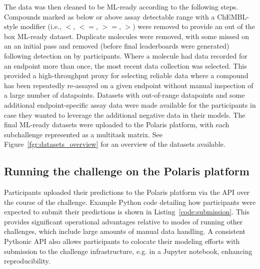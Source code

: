 \documentclass[journal=jcim,manuscript=article]{achemso}
\begin{document}
The data was then cleaned to be ML-ready according to the following steps. Compounds marked as below or above assay detectable range with a ChEMBL\cite{zdrazil_2024_chembl}-style modifier (i.e., $<$, $<=$, $>=$, $>$) were removed to provide an out of the box ML-ready dataset.  Duplicate molecules were removed, with some missed on an an initial pass and removed (before final leaderboards were generated) following detection on by participants. Where a molecule had data recorded for an endpoint more than once, the most recent data collection was selected. This provided a high-throughput proxy for selecting reliable data where a compound has been repeatedly re-assayed on a given  endpoint without manual inspection of a large number of datapoints. Datasets with out-of-range datapoints and some additional endpoint-specific assay data were made available for the participants in case they wanted to leverage the additional negative data in their models. The final ML-ready datasets were uploaded to the Polaris platform, with each subchallenge represented as a multitask matrix. See Figure~\ref{fgr:datasets_overview} for an overview of the datasets available. 

\subsection{Running the challenge on the Polaris platform}

Participants uploaded their predictions to the Polaris platform via the API over the course of the challenge. Example Python code detailing how participants were expected to submit their predictions is shown in Listing~\ref{code:submission}. This provides significant operational advantages relative to modes of running other challenges, which include large amounts of manual data handling. A consistent Pythonic API also allows participants to colocate their modeling efforts with submission to the challenge infrastructure, e.g. in a Jupyter notebook\cite{kluyver_2016_jupyter}, enhancing reproducibility.
\end{document}
